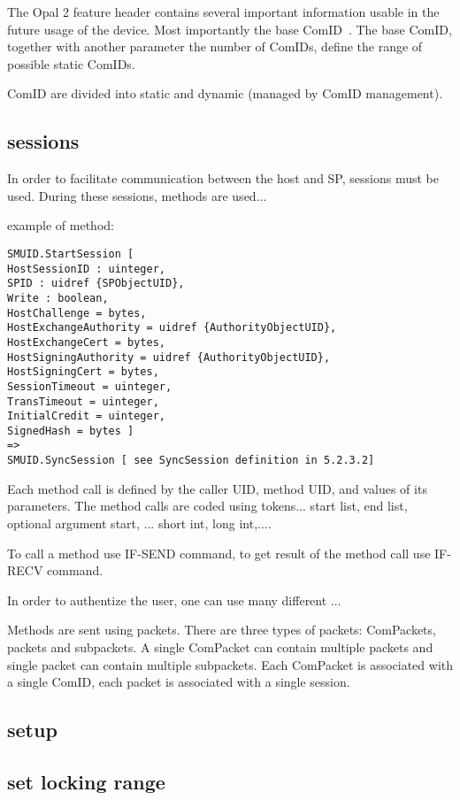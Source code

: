 \documentclass[
  digital, %
  oneside, %
  nolof,     %
  nolot,     %
]{fithesis4}
\begin{document}
The Opal 2 feature header contains several important information usable in the future usage of the device. Most importantly the base ComID~\cite[3.3.2]{tcg-storage-core}. The base ComID, together with another parameter the number of ComIDs, define the range of possible static ComIDs.

ComID are divided into static and dynamic (managed by ComID management).

\subsection{sessions}

In order to facilitate communication between the host and SP, sessions must be used. During these sessions, methods are used...

example of method: 

\begin{lstlisting}
SMUID.StartSession [
HostSessionID : uinteger,
SPID : uidref {SPObjectUID},
Write : boolean,
HostChallenge = bytes,
HostExchangeAuthority = uidref {AuthorityObjectUID},
HostExchangeCert = bytes,
HostSigningAuthority = uidref {AuthorityObjectUID},
HostSigningCert = bytes,
SessionTimeout = uinteger,
TransTimeout = uinteger,
InitialCredit = uinteger,
SignedHash = bytes ]
=>
SMUID.SyncSession [ see SyncSession definition in 5.2.3.2]
\end{lstlisting}

Each method call is defined by the caller UID, method UID, and values of its parameters.
The method calls are coded using tokens... start list, end list, optional argument start, ... short int, long int,....

To call a method use IF-SEND command, to get result of the method call use IF-RECV command.

In order to authentize the user, one can use many different ...



Methods are sent using packets. There are three types of packets: ComPackets, packets and subpackets. A single ComPacket can contain multiple packets and single packet can contain multiple subpackets. Each ComPacket is associated with a single ComID, each packet is associated with a single session.



\subsection{setup}
\subsection{set locking range}
\end{document}
